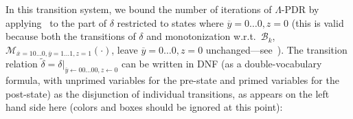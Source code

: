 \documentclass[acmsmall,screen]{acmart}
\newcommand{\ov}{\overline}
\newcommand{\tr}{\delta}
\renewcommand{\vec}{\ov}
\newcommand{\bkwrch}[1]{\mathcal{B}_{#1}}
\newcommand{\monox}[2]{\mathcal{M}_{#2}({#1})}
\newcommand{\restrict}[2]{{#1}\big|_{#2}}
\begin{document}
In this transition system, we bound the number of iterations of $\Lambda$-PDR by applying~ to the part of $\tr$ restricted to states where $\vec{y}=0\ldots0,z=0$ (this is valid because both the transitions of $\tr$ and monotonization
%
w.r.t.\ $\bkwrch{k}$, $\monox{\cdot}{\vec{x}=10\ldots0,\vec{y}=1\ldots1,z=1}$, leave $\vec{y}=0\ldots0,z=0$ unchanged---see~). %
%
The transition relation $\tilde{\tr} = \restrict{\tr}{\vec{y}\gets00\ldots00, z\gets0}$ can be written in DNF (as a double-vocabulary formula, with unprimed variables for the pre-state and primed variables for the post-state) as the disjunction of individual transitions, as appears on the left hand side here (colors and boxes should be ignored at this point): %
\newcommand*{\bbox}{%
  \tcboxmath[colback=white, colframe=black, size=fbox, arc=0pt, boxrule=0.4pt]%
}
\newcommand*{\nbox}{%
  \tcboxmath[colback=white, colframe=white, size=fbox, arc=0pt, boxrule=0.4pt]%
}
\small
%
%
%
%
%
%
%
%
%
%
%
%
%
%
%
%
%
%
%
%
%
%
%
%
%
%
%
%
%
%
%
%
%
%
%
%
%
%
%
%
%
%
%
%
%
%
%
\end{document}
